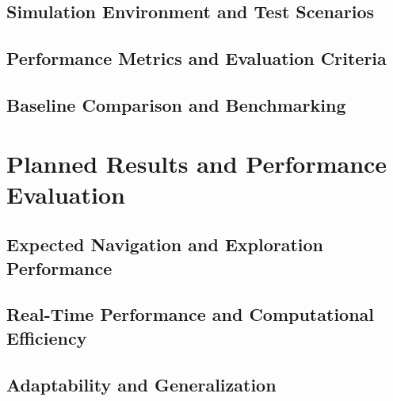 \subsection{Simulation Environment and Test Scenarios}

\subsection{Performance Metrics and Evaluation Criteria}

\subsection{Baseline Comparison and Benchmarking}

\section{Planned Results and Performance Evaluation}

\subsection{Expected Navigation and Exploration Performance}

\subsection{Real-Time Performance and Computational Efficiency}

\subsection{Adaptability and Generalization}

